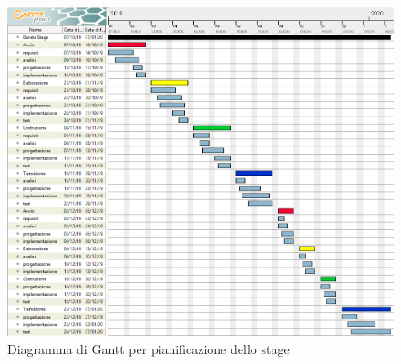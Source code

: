\begin{figure}
\begin{center}
\includegraphics[width=1.0\columnwidth]{images/ganttstoianov.png}
\end{center}
\caption{Diagramma di Gantt per pianificazione dello stage}
\label{fig:gantt}
\end{figure}




